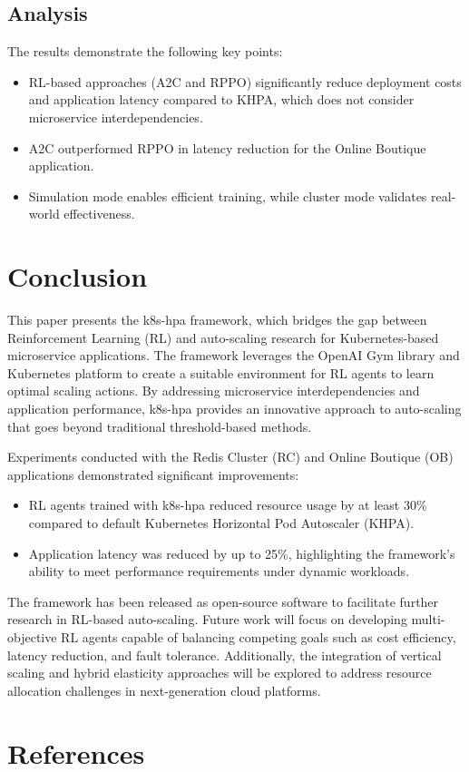 \documentclass[conference]{IEEEtran}
\begin{document}
\subsection{Analysis}

The results demonstrate the following key points:
\begin{itemize}
    \item RL-based approaches (A2C and RPPO) significantly reduce deployment costs and application latency compared to KHPA, which does not consider microservice interdependencies.
    \item A2C outperformed RPPO in latency reduction for the Online Boutique application.
    \item Simulation mode enables efficient training, while cluster mode validates real-world effectiveness.
\end{itemize}

\section{Conclusion}
\label{sec:conclusion}
This paper presents the k8s-hpa framework, which bridges the gap between Reinforcement Learning (RL) and auto-scaling research for Kubernetes-based microservice applications. The framework leverages the OpenAI Gym library and Kubernetes platform to create a suitable environment for RL agents to learn optimal scaling actions. By addressing microservice interdependencies and application performance, k8s-hpa provides an innovative approach to auto-scaling that goes beyond traditional threshold-based methods.

Experiments conducted with the Redis Cluster (RC) and Online Boutique (OB) applications demonstrated significant improvements:
\begin{itemize}
    \item RL agents trained with k8s-hpa reduced resource usage by at least 30\% compared to default Kubernetes Horizontal Pod Autoscaler (KHPA).
    \item Application latency was reduced by up to 25\%, highlighting the framework's ability to meet performance requirements under dynamic workloads.
\end{itemize}

The framework has been released as open-source software to facilitate further research in RL-based auto-scaling. Future work will focus on developing multi-objective RL agents capable of balancing competing goals such as cost efficiency, latency reduction, and fault tolerance. Additionally, the integration of vertical scaling and hybrid elasticity approaches will be explored to address resource allocation challenges in next-generation cloud platforms.


\section*{References}

% 



\end{document}

